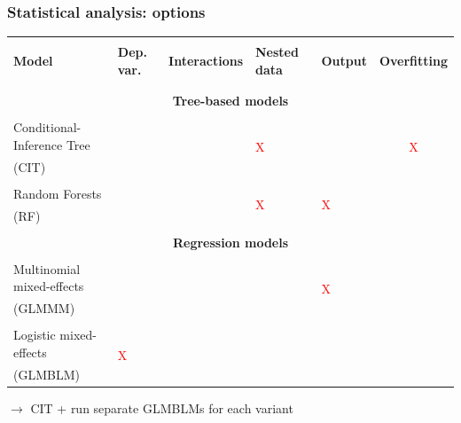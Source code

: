 \documentclass[12pt, table]{beamer}
\newcommand{\cmark}{\ding{51}}%
\begin{document}
\begin{frame}
\frametitle{Statistical analysis: options}
\begin{table}
\begin{tiny}
\begin{tabularx}{\textwidth}{l llllc}
\hline\\
\textbf{Model} & \textbf{Dep. var.} & \textbf{Interactions} & \textbf{Nested data} & \textbf{Output} & \textbf{Overfitting} \\\\
\hline\\
\multicolumn{6}{c}{\textbf{Tree-based models}} \\
\hline\\
Conditional-Inference Tree & 
\multirow{2}{*}{\textcolor{green}{\cmark}} & 
\multirow{2}{*}{\textcolor{green}{\cmark}} & 
\multirow{2}{*}{\textcolor{red}{X}}  &
\multirow{2}{*}{\textcolor{green}{\cmark}} & 
\multirow{2}{*}{\textcolor{red}{X}}  \\
(CIT)\\
\hline\\
Random Forests & 
\multirow{2}{*}{\textcolor{green}{\cmark}} & 
\multirow{2}{*}{\textcolor{green}{\cmark}} & 
\multirow{2}{*}{\textcolor{red}{X}}  &
\multirow{2}{*}{\textcolor{red}{X}}  &
\multirow{2}{*}{\textcolor{green}{\cmark}} \\
(RF)\\
\hline\\
\multicolumn{6}{c}{\textbf{Regression models}} \\
\hline\\
Multinomial mixed-effects   & 
\multirow{2}{*}{\textcolor{green}{\cmark}}& 
\multirow{2}{*}{\textcolor{green}{\cmark}}& 
\multirow{2}{*}{\textcolor{green}{\cmark}} &
\multirow{2}{*}{\textcolor{red}{X}}  & 
\multirow{2}{*}{\textcolor{green}{\cmark}} \\
(GLMMM) \\
\hline\\
Logistic mixed-effects   & 
\multirow{2}{*}{\textcolor{red}{X}} & 
\multirow{2}{*}{\textcolor{green}{\cmark}} & 
\multirow{2}{*}{\textcolor{green}{\cmark}} &
\multirow{2}{*}{\textcolor{green}{\cmark}} & 
\multirow{2}{*}{\textcolor{green}{\cmark}} \\
(GLMBLM)\\
\hline
\end{tabularx}
\end{tiny}
\end{table}
$\rightarrow$ CIT + run separate GLMBLMs for each variant
\end{frame}
\end{document}
